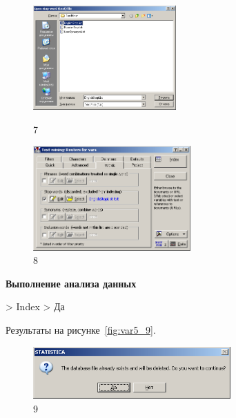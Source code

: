 \begin{figure}[!h]
  \centering

  \begin{minipage}{0.49\textwidth}
    \centering

    \includegraphics[height=4cm]
    {inc/var5/7.PNG}

    \caption{7}

    \label{fig:var5_7}
  \end{minipage}
  \begin{minipage}{0.49\textwidth}
    \centering

    \includegraphics[height=4cm]
    {inc/var5/8.PNG}

    \caption{8}

    \label{fig:var5_8}
  \end{minipage}
\end{figure}

\newpage

\begin{center}
  \textbf{Выполнение анализа данных}
\end{center}

> Index > Да

Результаты на рисунке~\ref{fig:var5_9}.

\begin{figure}[!h]
  \centering

  \includegraphics[height=2cm]
  {inc/var5/9.PNG}

  \caption{9}

  \label{fig:9}
\end{figure}

